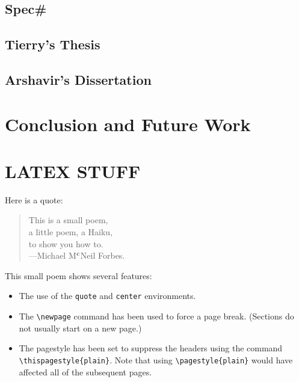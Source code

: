 \documentclass[msc,oneside]{ubcthesis}
\begin{document}
\section{Spec\#}

\section{Tierry's Thesis}

\section{Arshavir's Dissertation}

\chapter{Conclusion and Future Work}



\chapter{LATEX STUFF}

Here is a quote:
\begin{quote}
  \begin{center}
    This is a small poem,\\
    a little poem, a Haiku,\\
    to show you how to.\\
    ---Michael M$^{\rm c}$Neil Forbes.
  \end{center}
\end{quote}

This small poem shows several features:
\begin{itemize}
\item The use of the \verb|quote| and \verb|center| environments.
\item The \verb|\newpage| command has been used to force a page
  break.  (Sections do not usually start on a new page.)
\item The pagestyle has been set to suppress the headers using the
  command \verb|\thispagestyle{plain}|.  Note that using
  \verb|\pagestyle{plain}| would have affected all of the subsequent
  pages.
\end{itemize}
\end{document}
